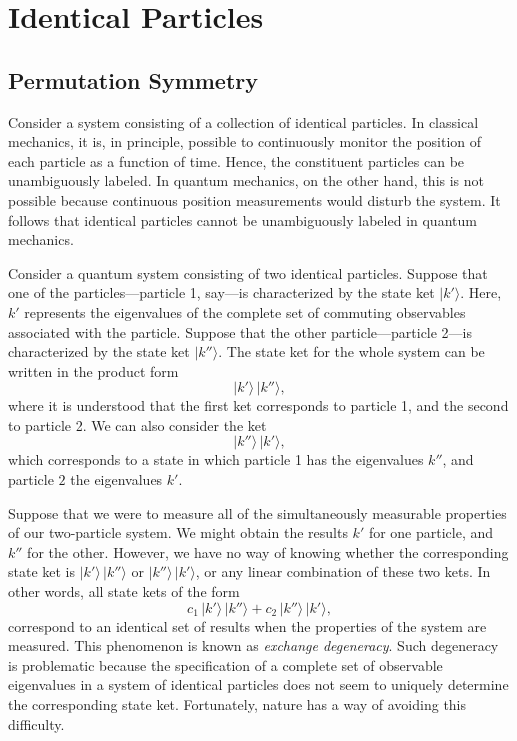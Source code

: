 \chapter{Identical Particles}

\section{Permutation Symmetry}
Consider a system consisting of a collection of identical particles. 
In classical mechanics, it is, in principle, possible to continuously monitor the position of each particle as a function of time. 
Hence, the constituent particles  can be unambiguously labeled. In quantum mechanics, on the other hand, this is not possible because continuous position
measurements would disturb the system. It follows that identical particles cannot be unambiguously labeled in quantum
mechanics. 

Consider a  quantum system consisting of two identical particles. Suppose that one of the particles---particle 1, say---is characterized by the state ket $|k'\rangle$. Here, $k'$
represents the eigenvalues of the complete set of commuting observables associated with the particle. Suppose that the other particle---particle 2---is
characterized by the state ket $|k''\rangle$. The state ket for the whole system can be written in the product form
\begin{equation}
|k'\rangle\,|k''\rangle,
\end{equation}
where it is understood that the first ket corresponds to particle 1, and the second to particle 2. We can also
consider the ket
\begin{equation}
|k''\rangle\,|k'\rangle,
\end{equation}
which corresponds to a state in which particle 1 has the eigenvalues $k''$, and particle $2$ the eigenvalues $k'$. 

Suppose that we were to measure all of the simultaneously measurable properties of our two-particle system. We might obtain the results $k'$ for one particle, and $k''$ for the other.
However, we have no way of knowing whether the corresponding state ket is $|k'\rangle\,|k''\rangle$ or $|k''\rangle\,|k'\rangle$, or any
linear combination of these two kets. In other words, all state kets of the form
\begin{equation}
c_1\,|k'\rangle\,|k''\rangle + c_2\,|k''\rangle\,|k'\rangle,
\end{equation}
correspond to an identical set of results when the properties of the system are measured. This phenomenon is
known as {\em exchange degeneracy}. Such degeneracy is problematic because the specification of a complete set of  observable eigenvalues in a system of identical particles does not seem to uniquely determine the corresponding state ket. Fortunately,  nature has a way of avoiding this difficulty. 

